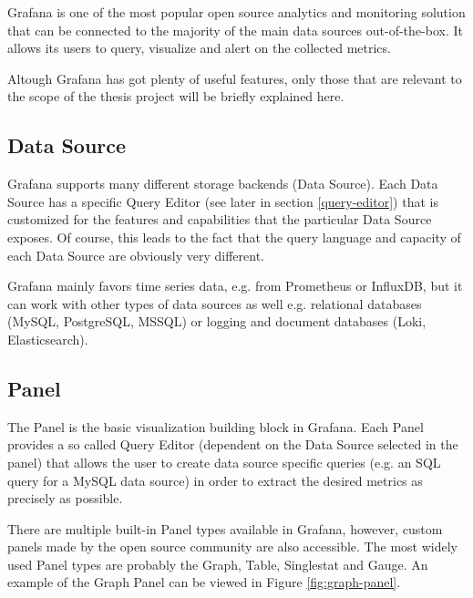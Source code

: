 Grafana is one of the most popular open source analytics and monitoring solution that can be connected to the majority of the main data sources out-of-the-box. It allows its users to query, visualize and alert on the collected metrics. 

Altough Grafana has got plenty of useful features, only those that are relevant to the scope of the thesis project will be briefly explained here.


\subsection{Data Source}

Grafana supports many different storage backends (Data Source). Each Data Source has a specific Query Editor (see later in section \ref*{query-editor}) that is customized for the features and capabilities that the particular Data Source exposes. Of course, this leads to the fact that the query language and capacity of each Data Source are obviously very different. \cite{grafana-datasource}

Grafana mainly favors time series data, e.g. from Prometheus or InfluxDB, but it can work with other types of data sources as well e.g. relational databases (MySQL, PostgreSQL, MSSQL) or logging and document databases (Loki, Elasticsearch).

\subsection{Panel}

The Panel is the basic visualization building block in Grafana. Each Panel provides a so called Query Editor (dependent on the Data Source selected in the panel) that allows the user to create data source specific queries (e.g. an SQL query for a MySQL data source) in order to extract the desired metrics as precisely as possible. \cite{grafana-panel}

There are multiple built-in Panel types available in Grafana, however, custom panels made by the open source community are also accessible. The most widely used Panel types are probably the Graph, Table, Singlestat and Gauge. An example of the Graph Panel can be viewed in Figure \ref{fig:graph-panel}.

